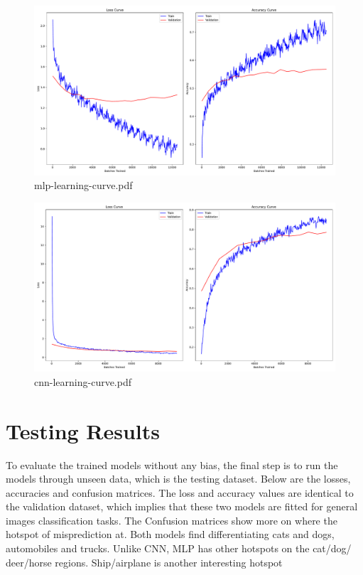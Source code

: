 \documentclass{report}
\begin{document}
\begin{figure}[ht]
    \center
    \includegraphics[scale=0.385]{../output/mlp-learning-curve.pdf}
    \caption{mlp-learning-curve.pdf}
\end{figure}

\begin{figure}[ht]
    \center
    \includegraphics[scale=0.385]{../output/cnn-learning-curve.pdf}
    \caption{cnn-learning-curve.pdf}
\end{figure}

\newpage
\section{Testing Results}
To evaluate the trained models without any bias, the final step is to run the models through unseen data, 
which is the testing dataset. Below are the losses, accuracies and confusion matrices. The loss and accuracy 
values are identical to the validation dataset, which implies that these two models are fitted for general images 
classification tasks. The Confusion matrices show more on where the hotspot of misprediction at. Both models
find differentiating cats and dogs, automobiles and trucks. Unlike CNN, MLP has other hotspots on the cat/dog/
deer/horse regions. Ship/airplane is another interesting hotspot
\end{document}
